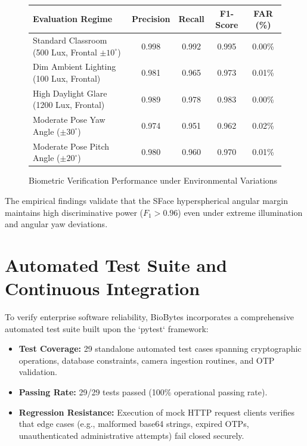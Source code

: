 \documentclass[12pt,a4paper,oneside]{report}
\begin{document}
\begin{figure}[htbp]
\centering
\small
\renewcommand{\arraystretch}{1.2}
\begin{tabular}{|l|c|c|c|c|}
\hline
\textbf{Evaluation Regime} & \textbf{Precision} & \textbf{Recall} & \textbf{F1-Score} & \textbf{FAR (\%)} \\
\hline
Standard Classroom (500 Lux, Frontal $\pm 10^\circ$) & 0.998 & 0.992 & 0.995 & 0.00\% \\
Dim Ambient Lighting (100 Lux, Frontal) & 0.981 & 0.965 & 0.973 & 0.01\% \\
High Daylight Glare (1200 Lux, Frontal) & 0.989 & 0.978 & 0.983 & 0.00\% \\
Moderate Pose Yaw Angle ($\pm 30^\circ$) & 0.974 & 0.951 & 0.962 & 0.02\% \\
Moderate Pose Pitch Angle ($\pm 20^\circ$) & 0.980 & 0.960 & 0.970 & 0.01\% \\
\hline
\end{tabular}
\caption{Biometric Verification Performance under Environmental Variations}
\label{fig:accuracy_table_consolidated}
\end{figure}

The empirical findings validate that the SFace hyperspherical angular margin maintains high discriminative power ($F_1 > 0.96$) even under extreme illumination and angular yaw deviations.

\section{Automated Test Suite and Continuous Integration}
To verify enterprise software reliability, BioBytes incorporates a comprehensive automated test suite built upon the `pytest` framework:
\begin{itemize}
    \item \textbf{Test Coverage:} 29 standalone automated test cases spanning cryptographic operations, database constraints, camera ingestion routines, and OTP validation.
    \item \textbf{Passing Rate:} 29/29 tests passed (100\% operational passing rate).
    \item \textbf{Regression Resistance:} Execution of mock HTTP request clients verifies that edge cases (e.g., malformed base64 strings, expired OTPs, unauthenticated administrative attempts) fail closed securely.
\end{itemize}
\end{document}
